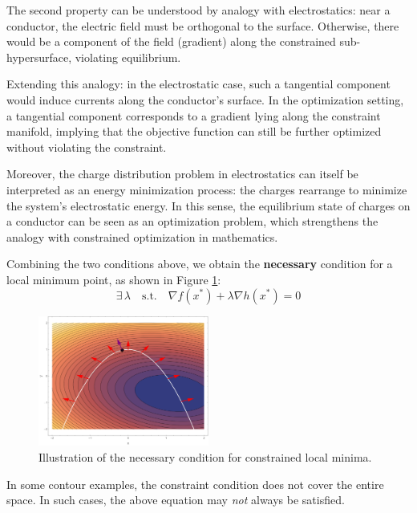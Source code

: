 \documentclass[../main]{subfiles}
\begin{document}
\begin{note}
    The second property can be understood by analogy with electrostatics: near a conductor, the electric field must be orthogonal to the surface. Otherwise, there would be a component of the field (gradient) along the constrained sub-hypersurface, violating equilibrium.  

    Extending this analogy: in the electrostatic case, such a tangential component would induce currents along the conductor’s surface.  
    In the optimization setting, a tangential component corresponds to a gradient lying along the constraint manifold, implying that the objective function can still be further optimized without violating the constraint.  

    Moreover, the charge distribution problem in electrostatics can itself be interpreted as an energy minimization process: the charges rearrange to minimize the system’s electrostatic energy.  
    In this sense, the equilibrium state of charges on a conductor can be seen as an optimization problem, which strengthens the analogy with constrained optimization in mathematics.
\end{note}
\vspace{0.5em}

Combining the two conditions above, we obtain the \textbf{necessary} condition for a local minimum point, as shown in Figure \ref{3-lp}:
\begin{equation}
    \exists \,\lambda \quad \text{s.t.} \quad \nabla f(x^*) + \lambda \nabla h(x^*) = 0
\end{equation}


\begin{figure}[h]
    \centering
    \includegraphics[width=0.5\textwidth]{../../fig/fig1.pdf}
    \caption{Illustration of the necessary condition for constrained local minima.}
    \label{3-lp}
\end{figure}

\begin{remark}
    In some contour examples, the constraint condition does not cover the entire space.  
    In such cases, the above equation may \emph{not} always be satisfied.
\end{remark}
\end{document}
